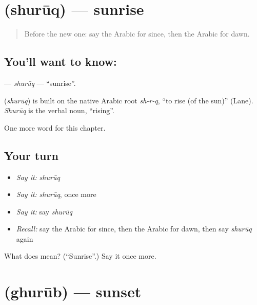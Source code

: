 \section[\texorpdfstring{\ar{شروق} (shurūq)}{شروق (shurūq)}]{ (shurūq) — sunrise}

\label{lesson:AR-C233-shuruq}



\begin{quote}
Before the new one: say the Arabic for since, then the Arabic for dawn.
\end{quote}

\subsection*{You'll want to know: }
\textbf{} — \emph{shurūq} — \textquotedblleft{}sunrise\textquotedblright{}.

\begin{cousinweb}
\textbf{} (\emph{shurūq}) is built on the native Arabic root \emph{sh-r-q}, \textquotedblleft{}to rise (of the sun)\textquotedblright{} (Lane). \emph{Shurūq} is the verbal noun, \textquotedblleft{}rising\textquotedblright{}.
\end{cousinweb}

\begin{grammarlens}[title={What you've built}]
One more word for this chapter.
\end{grammarlens}

\subsection*{Your turn}
\begin{itemize}
\raggedright
  \item \emph{Say it:} \emph{shurūq}
  \item \emph{Say it:} \emph{shurūq}, once more
  \item \emph{Say it:} say \emph{shurūq}
  \item \emph{Recall:} say the Arabic for since, then the Arabic for dawn, then say \emph{shurūq} again
\end{itemize}

\begin{tcolorbox}[breakable,colback=teal!4,colframe=teal!35!black,title={Before you move on}]
What does  mean? (\textquotedblleft{}Sunrise\textquotedblright{}.) Say it once more.
\end{tcolorbox}
\section[\texorpdfstring{\ar{غروب} (ghurūb)}{غروب (ghurūb)}]{ (ghurūb) — sunset}

